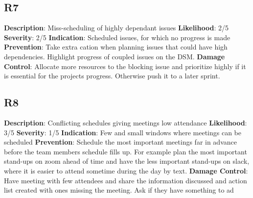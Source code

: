 \documentclass{article}
\begin{document}
\subsection{R7}
\textbf{Description}: Miss-scheduling of highly dependant issues \newline
\textbf{Likelihood}: 2/5\newline
\textbf{Severity}: 2/5\newline
\textbf{Indication}: Scheduled issues, for which no progress is made \newline
\textbf{Prevention}: Take extra cation when planning issues that could have high dependencies. Highlight progress of coupled issues on the DSM. \newline
\textbf{Damage Control}: Allocate more resources to the blocking issue and prioritize highly if it is essential for the projects progress. Otherwise push it to a later sprint.  \newline

\subsection{R8}
\textbf{Description}: Conflicting schedules giving meetings low attendance \newline
\textbf{Likelihood}: 3/5\newline
\textbf{Severity}: 1/5\newline
\textbf{Indication}: Few and small windows where meetings can be scheduled \newline
\textbf{Prevention}: Schedule the most important meetings far in advance before the team members schedule fills up. For example plan the most important stand-ups on zoom ahead of time and have the less important stand-ups on slack, where it is easier to attend sometime during the day by text. \newline
\textbf{Damage Control}: Have meeting with few attendees and share the information discussed and action list created with ones missing the meeting. Ask if they have something to ad \newline
\end{document}
